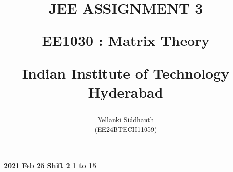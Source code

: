 \documentclass[journal]{IEEEtran}
\begin{document}

\onecolumn
\title{
JEE ASSIGNMENT 3

\large{EE1030 : Matrix Theory}

Indian Institute of Technology Hyderabad
}
\author{Yellanki Siddhanth

(EE24BTECH11059)
}	




\maketitle





\bigskip

\renewcommand{\thefigure}{\theenumi}
\renewcommand{\thetable}{\theenumi}
 
    
        \textbf{2021 Feb 25 Shift 2 1 to 15}
    
\end{document}
